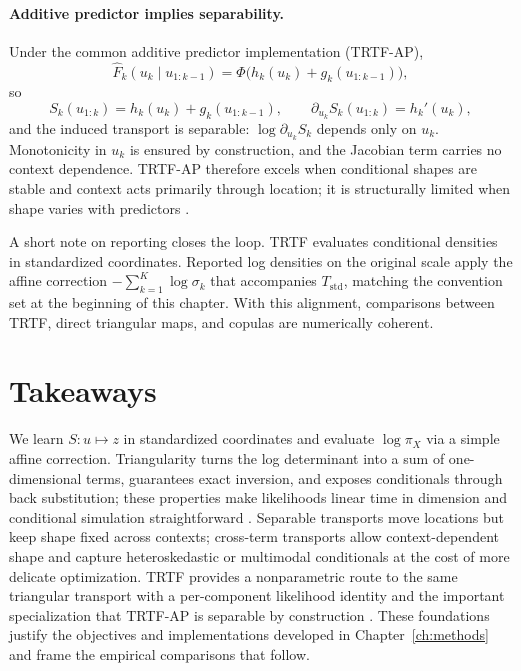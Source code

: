 \documentclass[11pt,a4paper,twoside]{book}\usepackage[]{graphicx}\usepackage[]{xcolor}
\begin{document}
\paragraph{Additive predictor implies separability.} Under the common additive predictor implementation (TRTF-AP),
\begin{equation}
  \widehat F_k(u_k\mid u_{1:k-1}) = \Phi\big(h_k(u_k)+g_k(u_{1:k-1})\big),
  \label{eq:trtf-additive}
\end{equation}
so
\begin{equation}
  S_k(u_{1:k}) = h_k(u_k)+g_k(u_{1:k-1}),
  \qquad
  \partial_{u_k}S_k(u_{1:k}) = h_k'(u_k),
  \label{eq:trtf-separable}
\end{equation}
and the induced transport is separable: $\log \partial_{u_k}S_k$ depends only on $u_k$. Monotonicity in $u_k$ is ensured by construction, and the Jacobian term carries no context dependence. TRTF-AP therefore excels when conditional shapes are stable and context acts primarily through location; it is structurally limited when shape varies with predictors \citep{hothorn2017transformation,hothorn2021transformation,hothorn2018conditional}.

A short note on reporting closes the loop. TRTF evaluates conditional densities in standardized coordinates. Reported log densities on the original scale apply the affine correction $-\sum_{k=1}^K \log \sigma_k$ that accompanies $T_{\mathrm{std}}$, matching the convention set at the beginning of this chapter. With this alignment, comparisons between TRTF, direct triangular maps, and copulas are numerically coherent.

\section{Takeaways}

We learn $S:u\mapsto z$ in standardized coordinates and evaluate $\log \pi_X$ via a simple affine correction. Triangularity turns the log determinant into a sum of one-dimensional terms, guarantees exact inversion, and exposes conditionals through back substitution; these properties make likelihoods linear time in dimension and conditional simulation straightforward \citep{rosenblatt1952remarks,knothe1957contributions,ramgraber2025friendly}. Separable transports move locations but keep shape fixed across contexts; cross-term transports allow context-dependent shape and capture heteroskedastic or multimodal conditionals at the cost of more delicate optimization. TRTF provides a nonparametric route to the same triangular transport with a per-component likelihood identity and the important specialization that TRTF-AP is separable by construction \citep{hothorn2017transformation,hothorn2021transformation,hothorn2018conditional}. These foundations justify the objectives and implementations developed in Chapter~\ref{ch:methods} and frame the empirical comparisons that follow.
\end{document}
